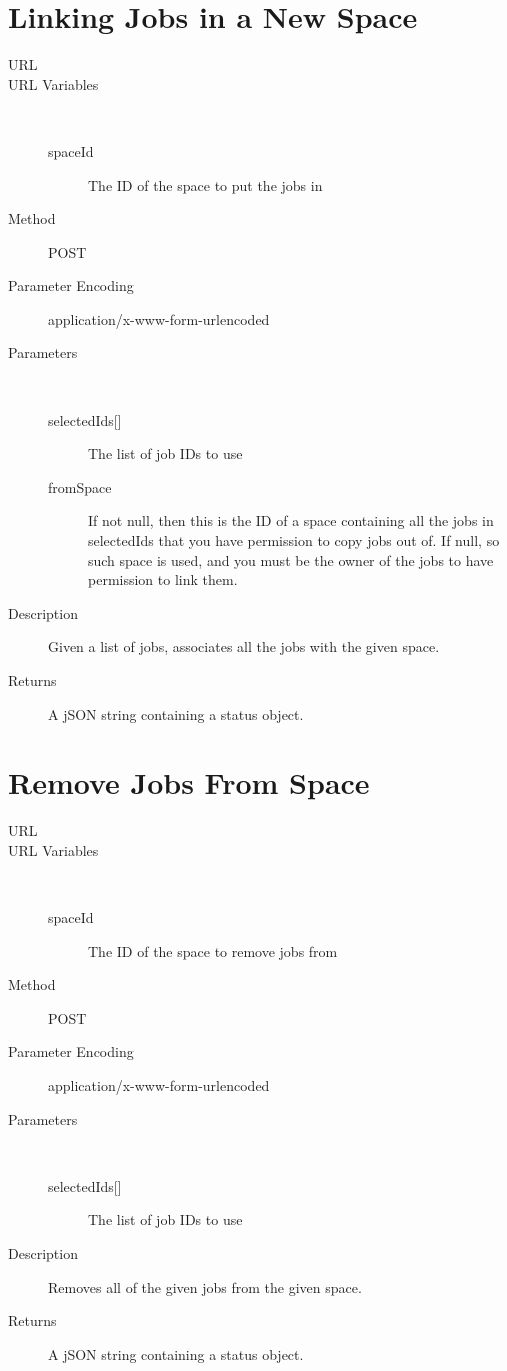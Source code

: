 \section{Linking Jobs in a New Space}
\begin{description}
\item [URL] 
\item [URL Variables] \
	\begin{description}
	\item [spaceId]  The ID of the space to put the jobs in
	\end{description}
\item [Method] POST
\item [Parameter Encoding] application/x-www-form-urlencoded
\item [Parameters] \
	\begin{description}
	\item [{selectedIds[]}]  The list of job IDs to use
	\item [fromSpace]  If not null, then this is the ID of a space containing all the jobs in selectedIds that you have permission to copy jobs out of. If null, so such space is used, and you must be the owner of the jobs to have permission to link them.
	\end{description}
\item [Description] Given a list of jobs, associates all the jobs with the given space.
\item [Returns] A jSON string containing a status object.
\end{description}


\section{Remove Jobs From Space}
\begin{description}
\item [URL] 
\item [URL Variables] \
	\begin{description}
	\item [spaceId] \type{Integer} The ID of the space to remove jobs from
	\end{description}
\item [Method] POST
\item [Parameter Encoding] application/x-www-form-urlencoded
\item [Parameters] \
	\begin{description}
	\item [{selectedIds[]}]  The list of job IDs to use
	\end{description}
\item [Description] Removes all of the given jobs from the given space.
\item [Returns] A jSON string containing a status object.
\end{description}


